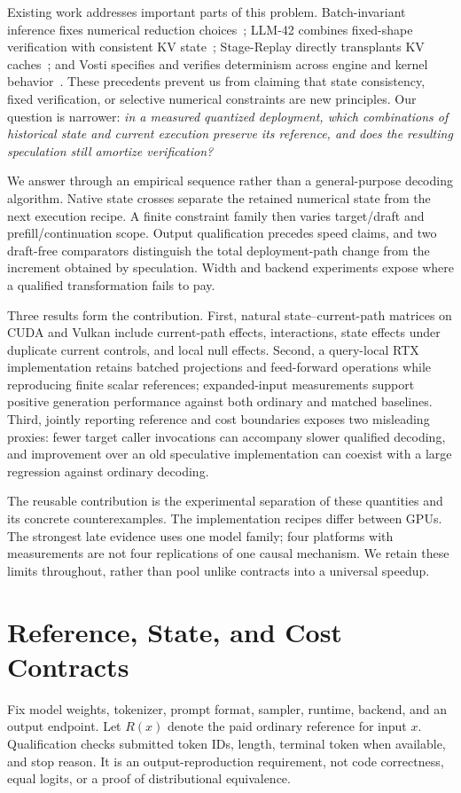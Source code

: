 \documentclass{article}
\begin{document}
Existing work addresses important parts of this problem. Batch-invariant inference fixes numerical reduction choices~\cite{thinkingmachines}; LLM-42 combines fixed-shape verification with consistent KV state~\cite{llm42}; Stage-Replay directly transplants KV caches~\cite{stagereplay}; and Vosti specifies and verifies determinism across engine and kernel behavior~\cite{vosti}. These precedents prevent us from claiming that state consistency, fixed verification, or selective numerical constraints are new principles. Our question is narrower: \emph{in a measured quantized deployment, which combinations of historical state and current execution preserve its reference, and does the resulting speculation still amortize verification?}

We answer through an empirical sequence rather than a general-purpose decoding algorithm. Native state crosses separate the retained numerical state from the next execution recipe. A finite constraint family then varies target/draft and prefill/continuation scope. Output qualification precedes speed claims, and two draft-free comparators distinguish the total deployment-path change from the increment obtained by speculation. Width and backend experiments expose where a qualified transformation fails to pay.

Three results form the contribution. First, natural state--current-path matrices on CUDA and Vulkan include current-path effects, interactions, state effects under duplicate current controls, and local null effects. Second, a query-local RTX implementation retains batched projections and feed-forward operations while reproducing finite scalar references; expanded-input measurements support positive generation performance against both ordinary and matched baselines. Third, jointly reporting reference and cost boundaries exposes two misleading proxies: fewer target caller invocations can accompany slower qualified decoding, and improvement over an old speculative implementation can coexist with a large regression against ordinary decoding.

The reusable contribution is the experimental separation of these quantities and its concrete counterexamples. The implementation recipes differ between GPUs. The strongest late evidence uses one model family; four platforms with measurements are not four replications of one causal mechanism. We retain these limits throughout, rather than pool unlike contracts into a universal speedup.

\section{Reference, State, and Cost Contracts}
\label{sec:contracts}
Fix model weights, tokenizer, prompt format, sampler, runtime, backend, and an output endpoint. Let $R(x)$ denote the paid ordinary reference for input $x$. Qualification checks submitted token IDs, length, terminal token when available, and stop reason. It is an output-reproduction requirement, not code correctness, equal logits, or a proof of distributional equivalence.
\end{document}
